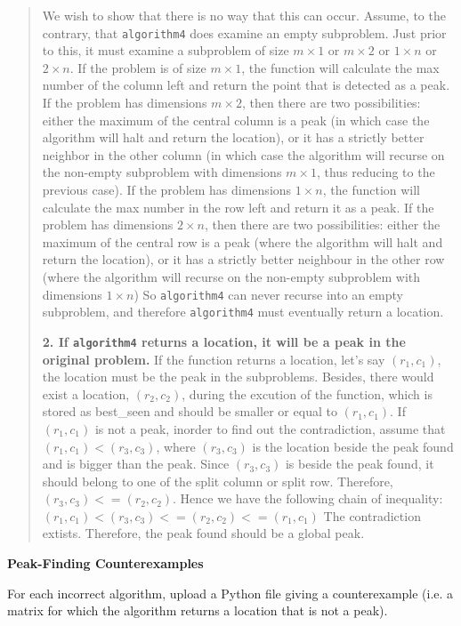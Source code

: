 \documentclass[12pt,twoside]{article}
\begin{document}
\begin{problems}
\begin{quote}
We wish to show that there is no way that this can occur.
Assume, to the contrary,
that \texttt{algorithm4} does examine an empty subproblem.
Just prior to this,
it must examine a subproblem of size
$m \times 1$ or $m \times 2$ or $1 \times n$ or $2 \times n$.
If the problem is of size $m \times 1$,
the function will calculate the max number of the column left
and return the point that is detected as a peak.
If the problem has dimensions $m \times 2$,
then there are two possibilities:
either the maximum of the central column is a peak
(in which case the algorithm will halt and return the location),
or it has a strictly better neighbor in the other column
(in which case the algorithm will recurse
on the non-empty subproblem with dimensions $m \times 1$,
thus reducing to the previous case).
If the problem has dimensions $1 \times n$,
the function will calculate the max number in the row left
and return it as a peak.
If the problem has dimensions $2 \times n$,
then there are two possibilities:
either the maximum of the central row is a peak
(where the algorithm will halt and return the location),
or it has a strictly better neighbour in the other row
(where the algorithm will recurse on the non-empty subproblem
with dimensions $1 \times n$)
So \texttt{algorithm4} can never recurse into an empty subproblem,
and therefore \texttt{algorithm4} must eventually return a location.

{\bf 2. If \texttt{algorithm4} returns a location,
it will be a peak in the original problem.}
If the function returns a location, let's say $(r_1, c_1)$, the location
must be the peak in the subproblems. Besides, there would exist a location, $(r_2, c_2)$, 
during the excution of the function, which is stored as best_seen
and should be smaller or equal to $(r_1, c_1)$.
If $(r_1, c_1)$ is not a peak, inorder to find out the contradiction, 
assume that $(r_1, c_1) < (r_3, c_3)$, where $(r_3, c_3)$ is the
location beside the peak found and is bigger than the peak.
Since $(r_3, c_3)$ is beside the peak found, it should belong to one of the 
split column or split row. Therefore, $(r_3, c_3) <= (r_2, c_2)$.
Hence we have the following chain of inequality:
$(r_1, c_1) < (r_3, c_3) <= (r_2, c_2) <= (r_1, c_1)$ 
The contradiction extists. Therefore, the peak found should be 
a global peak.
\end{quote}
\fi

\problem {} \textbf{Peak-Finding Counterexamples}

For each incorrect algorithm,
upload a Python file giving a counterexample
(i.e. a matrix for which the algorithm returns a location
that is not a peak).


\end{problems}
\end{document}
